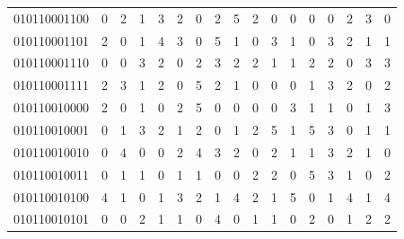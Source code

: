 \documentclass[10pt,a4paper]{article}
\begin{document}
\begin{longtable}{ |c|c|c|c|c|c|c|c|c|c|c|c|c|c|c|c|c| }
    010110001100              & 0                            & 2                                & 1                            & 3                              & 2   & 0   & 2   & 5   & 2   & 0   & 0   & 0   & 0   & 2   & 3   & 0   \\
    010110001101              & 2                            & 0                                & 1                            & 4                              & 3   & 0   & 5   & 1   & 0   & 3   & 1   & 0   & 3   & 2   & 1   & 1   \\
    010110001110              & 0                            & 0                                & 3                            & 2                              & 0   & 2   & 3   & 2   & 2   & 1   & 1   & 2   & 2   & 0   & 3   & 3   \\
    010110001111              & 2                            & 3                                & 1                            & 2                              & 0   & 5   & 2   & 1   & 0   & 0   & 0   & 1   & 3   & 2   & 0   & 2   \\
    010110010000              & 2                            & 0                                & 1                            & 0                              & 2   & 5   & 0   & 0   & 0   & 0   & 3   & 1   & 1   & 0   & 1   & 3   \\
    010110010001              & 0                            & 1                                & 3                            & 2                              & 1   & 2   & 0   & 1   & 2   & 5   & 1   & 5   & 3   & 0   & 1   & 1   \\
    010110010010              & 0                            & 4                                & 0                            & 0                              & 2   & 4   & 3   & 2   & 0   & 2   & 1   & 1   & 3   & 2   & 1   & 0   \\
    010110010011              & 0                            & 1                                & 1                            & 0                              & 1   & 1   & 0   & 0   & 2   & 2   & 0   & 5   & 3   & 1   & 0   & 2   \\
    010110010100              & 4                            & 1                                & 0                            & 1                              & 3   & 2   & 1   & 4   & 2   & 1   & 5   & 0   & 1   & 4   & 1   & 4   \\
    010110010101              & 0                            & 0                                & 2                            & 1                              & 1   & 0   & 4   & 0   & 1   & 1   & 0   & 2   & 0   & 1   & 2   & 2   \\

\end{longtable}
\end{document}
